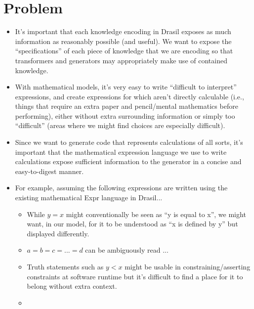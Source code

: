 
\section{Problem}

\begin{itemize}

	\item It's important that each knowledge encoding in Drasil exposes as much
	      information as reasonably possible (and useful).  We want to expose the ``specifications'' of each piece
          of knowledge that we are encoding so that transformers and generators 
		  may appropriately make use of contained knowledge.

	\item With mathematical models, it's very easy to write ``difficult to
	      interpret'' expressions, and create expressions for which aren't
	      directly calculable (i.e., things that require an extra paper and
	      pencil/mental mathematics before performing), either without
		  extra surrounding information or simply too ``difficult'' (areas
		  where we might find choices are especially difficult).

	\item Since we want to generate code that represents calculations of all
	      sorts, it's important that the mathematical expression language we
	      use to write calculations expose sufficient information to the
	      generator in a concise and easy-to-digest manner. 

	\item For example, assuming the following expressions are written using
	      the existing mathematical Expr language in Drasil...
	      \begin{itemize}

		      \item While \(y = x\) might conventionally be seen as ``y is 
			  		equal to x'', we might want, in our model, for it to be
		            understood as ``x is defined by y'' but displayed differently.

		      \item \(a = b = c = ... = d\) can be ambiguously read ...

		      \item Truth statements such as \(y < x\) might be usable in
			        constraining/asserting constraints at software runtime
					but it's difficult to find a place for it to belong
					without extra context.

		      \item {}

	      \end{itemize}

\end{itemize}


